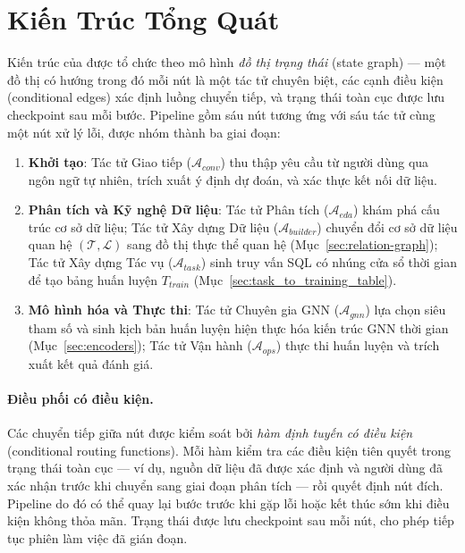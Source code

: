 \section{Kiến Trúc Tổng Quát}
\label{sec:architecture}

Kiến trúc của \tool được tổ chức theo mô hình \textit{đồ thị trạng thái} (state graph) --- một đồ thị có hướng trong đó mỗi nút là một tác tử chuyên biệt, các cạnh điều kiện (conditional edges) xác định luồng chuyển tiếp, và trạng thái toàn cục được lưu checkpoint sau mỗi bước. Pipeline gồm sáu nút tương ứng với sáu tác tử cùng một nút xử lý lỗi, được nhóm thành ba giai đoạn:

\begin{enumerate}
    \item \textbf{Khởi tạo}: Tác tử Giao tiếp ($\mathcal{A}_{conv}$) thu thập yêu cầu từ người dùng qua ngôn ngữ tự nhiên, trích xuất ý định dự đoán, và xác thực kết nối dữ liệu.
    \item \textbf{Phân tích và Kỹ nghệ Dữ liệu}: Tác tử Phân tích ($\mathcal{A}_{eda}$) khám phá cấu trúc cơ sở dữ liệu; Tác tử Xây dựng Dữ liệu ($\mathcal{A}_{builder}$) chuyển đổi cơ sở dữ liệu quan hệ $(\mathcal{T}, \mathcal{L})$ sang đồ thị thực thể quan hệ (Mục~\ref{sec:relation-graph}); Tác tử Xây dựng Tác vụ ($\mathcal{A}_{task}$) sinh truy vấn SQL có nhúng cửa sổ thời gian để tạo bảng huấn luyện $T_{train}$ (Mục~\ref{sec:task_to_training_table}).
    \item \textbf{Mô hình hóa và Thực thi}: Tác tử Chuyên gia GNN ($\mathcal{A}_{gnn}$) lựa chọn siêu tham số và sinh kịch bản huấn luyện hiện thực hóa kiến trúc GNN thời gian (Mục~\ref{sec:encoders}); Tác tử Vận hành ($\mathcal{A}_{ops}$) thực thi huấn luyện và trích xuất kết quả đánh giá.
\end{enumerate}

\paragraph{Điều phối có điều kiện.}
Các chuyển tiếp giữa nút được kiểm soát bởi \textit{hàm định tuyến có điều kiện} (conditional routing functions). Mỗi hàm kiểm tra các điều kiện tiên quyết trong trạng thái toàn cục --- ví dụ, nguồn dữ liệu đã được xác định và người dùng đã xác nhận trước khi chuyển sang giai đoạn phân tích --- rồi quyết định nút đích. Pipeline do đó có thể quay lại bước trước khi gặp lỗi hoặc kết thúc sớm khi điều kiện không thỏa mãn. Trạng thái được lưu checkpoint sau mỗi nút, cho phép tiếp tục phiên làm việc đã gián đoạn.

